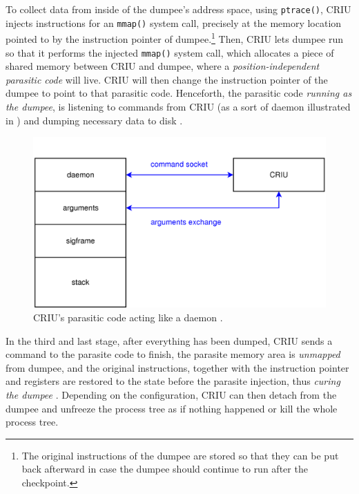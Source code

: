 \documentclass[
  digital,     %
  oneside,     %
  nosansbold,  %
  nocolorbold, %
  lof,         %
  nolot,         %
]{fithesis4}
\begin{document}
To collect data from inside of the dumpee's address space, using \texttt{ptrace()}, CRIU injects instructions for an \texttt{mmap()} system call, precisely at the memory location pointed to by the instruction pointer of dumpee.\footnote{The original instructions of the dumpee are stored so that they can be put back afterward in case the dumpee should continue to run after the checkpoint.} Then, CRIU lets dumpee run so that it performs the injected \texttt{mmap()} system call, which allocates a piece of shared memory between CRIU and dumpee, where a \emph{position-independent parasitic code} will live. CRIU will then change the instruction pointer of the dumpee to point to that parasitic code. Henceforth, the parasitic code \emph{running as the dumpee}, is listening to commands from CRIU (as a sort of daemon illustrated in ) and dumping necessary data to disk \cite{criu_parasite}.

\begin{figure}[H]
  \begin{center}
  \includegraphics[width=\textwidth]{figures/criu-parasite-daemon.png}
  \end{center}
  \caption{CRIU's parasitic code acting like a daemon \cite{criu_parasite}.}
  \label{fig:parasite-daemon}
\end{figure}

In the third and last stage, after everything has been dumped, CRIU sends a command to the parasite code to finish, the parasite memory area is \emph{unmapped} from dumpee, and the original instructions, together with the instruction pointer and registers are restored to the state before the parasite injection, thus \emph{curing the dumpee} \cite{criu_parasite}. Depending on the configuration, CRIU can then detach from the dumpee and unfreeze the process tree as if nothing happened or kill the whole process tree.
\end{document}
